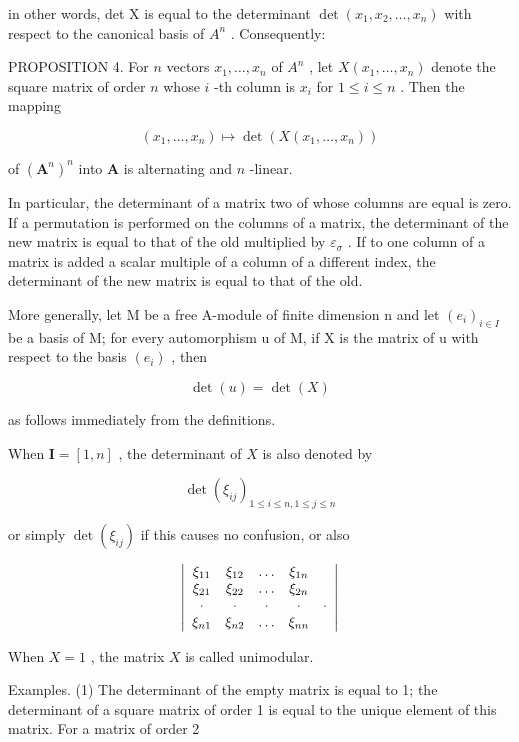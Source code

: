 in other words, det X is equal to the determinant \(\det(x_{1}, x_{2}, \ldots, x_{n})\) with respect to the canonical basis of \(A^{n}\) . Consequently:

PROPOSITION 4. For \(n\) vectors \(x_1, \ldots, x_n\) of \(A^n\) , let \(X(x_1, \ldots, x_n)\) denote the square matrix of order \(n\) whose \(i\) -th column is \(x_i\) for \(1 \leqslant i \leqslant n\) . Then the mapping

\[
(x _ {1}, \dots , x _ {n}) \mapsto \det (X (x _ {1}, \dots , x _ {n}))
\]

of \((\mathbf{A}^n)^n\) into \(\mathbf{A}\) is alternating and \(n\) -linear.

In particular, the determinant of a matrix two of whose columns are equal is zero. If a permutation is performed on the columns of a matrix, the determinant of the new matrix is equal to that of the old multiplied by \(\varepsilon_{\sigma}\) . If to one column of a matrix is added a scalar multiple of a column of a different index, the determinant of the new matrix is equal to that of the old.

More generally, let M be a free A-module of finite dimension n and let \((e_{i})_{i\in I}\) be a basis of M; for every automorphism u of M, if X is the matrix of u with respect to the basis \((e_{i})\) , then

\[
\det (u) = \det (X)\tag{7}
\]

as follows immediately from the definitions.

When \(\mathbf{I} = [1, n]\) , the determinant of \(X\) is also denoted by

\[
\det (\xi_ {i j}) _ {1 \leqslant i \leqslant n, 1 \leqslant j \leqslant n}
\]

or simply \(\operatorname{det}(\xi_{ij})\) if this causes no confusion, or also

\[
\left| \begin{array}{c c c c c} \xi_ {1 1} & \xi_ {1 2} & \ldots & \xi_ {1 n} \\ \xi_ {2 1} & \xi_ {2 2} & \ldots & \xi_ {2 n} \\ \cdot & \cdot & \cdot & \cdot & \cdot \\ \xi_ {n 1} & \xi_ {n 2} & \ldots & \xi_ {n n} \end{array} \right|
\]

When \(X = 1\) , the matrix \(X\) is called unimodular.

Examples. (1) The determinant of the empty matrix is equal to 1; the determinant of a square matrix of order 1 is equal to the unique element of this matrix. For a matrix of order 2

